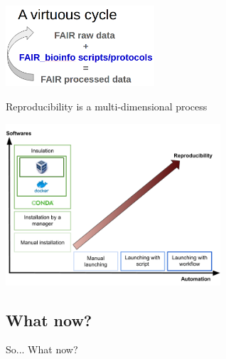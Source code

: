 \begin{frame}{\FAIRB}
\begin{columns}[t]
\begin{column}{.25\textwidth}
\begin{center}
     \end{center}
  \end{column}
\end{columns}
\begin{center}
    \includegraphics[height=3cm]{09_conclusion/images/FAIR_virtuousCircle.png}
\end{center}
\end{frame}

\begin{frame}{\FAIRB}

Reproducibility is a multi-dimensional process

\begin{center}
    \includegraphics[width=8cm]{09_conclusion/images/FAIR_2d_reproducibility.png}
\end{center}

\end{frame}

\subsection{What now?}

\begin{frame}{}

\huge{So... What now?}

\end{frame}

